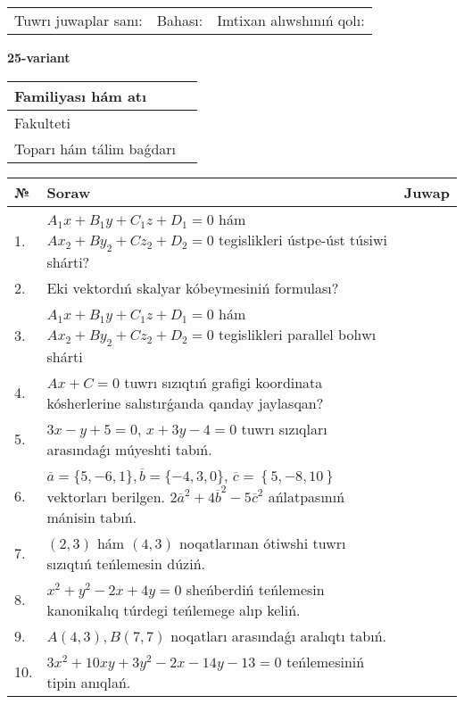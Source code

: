 \documentclass{article}
\begin{document}
\vspace{1cm}

\begin{tabular}{lll}
Tuwrı juwaplar sanı: \underline{\hspace{1.5cm}} & 
Bahası: \underline{\hspace{1.5cm}} & 
Imtixan alıwshınıń qolı: \underline{\hspace{2cm}} \\
\end{tabular}

\egroup

\newpage


\textbf{25-variant}\\

\bgroup
\def\arraystretch{1.6} %

\begin{tabular}{|m{5.7cm}|m{9.5cm}|}
\hline
Familiyası hám atı & \\
\hline
Fakulteti  & \\
\hline
Toparı hám tálim baǵdarı  & \\
\hline
\end{tabular}

\vspace{1cm}

\begin{tabular}{|m{0.7cm}|m{10cm}|m{4cm}|}
\hline
№ & Soraw & Juwap \\
\hline
1. & $A_1x+B_1y+C_1z+D_1=0$ hám $Ax_2+By_2+Cz_2+D_2=0$ tegislikleri ústpe-úst túsiwi shárti? &  \\
\hline
2. & Eki vektordıń skalyar kóbeymesiniń formulası? &  \\
\hline
3. & $A_1x+B_1y+C_1z+D_1=0$ hám $Ax_2+By_2+Cz_2+D_2=0$ tegislikleri parallel bolıwı shárti &  \\
\hline
4. & $Ax+C=0$ tuwrı sızıqtıń grafigi koordinata kósherlerine salıstırǵanda qanday jaylasqan? &  \\
\hline
5. & $3x-y+5=0$, $x+3y-4=0$ tuwrı sızıqları arasındaǵı múyeshti tabıń. &  \\
\hline
6. & $\overline{a}=\{5,-6, 1 \}, \overline{b}=\{-4, 3, 0 \} $, $\overline{c}=\left\{ 5,-8, 10 \right\}$ vektorları berilgen. $2{\overline{a}}^{2}+4{\overline{b}}^{2}-5{\overline{c}}^{2}$ ańlatpasınıń mánisin tabıń. &  \\
\hline
7. & $(2, 3)$ hám $(4, 3)$ noqatlarınan ótiwshi tuwrı sızıqtıń teńlemesin dúziń. &  \\
\hline
8. & $x^{2}+y^{2}-2x+4y=0$ sheńberdiń teńlemesin kanonikalıq túrdegi teńlemege alıp keliń. &  \\
\hline
9. & $A(4, 3), B(7, 7)$ noqatları arasındaǵı aralıqtı tabıń. &  \\
\hline
10. & $3x^{2}+10xy+3y^{2}-2x-14y-13=0$ teńlemesiniń tipin anıqlań. &  \\
\hline
\end{tabular}
\end{document}
